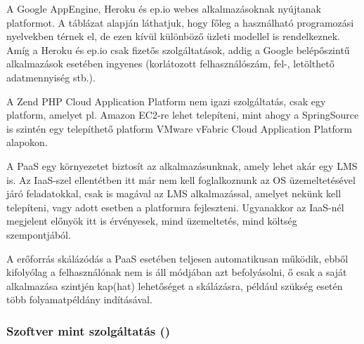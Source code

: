  

A Google AppEngine, Heroku és ep.io webes alkalmazásoknak nyújtanak platformot. A táblázat alapján láthatjuk, hogy főleg a használható programozási nyelvekben térnek el, de ezen kívül különböző üzleti modellel is rendelkeznek. Amíg a Heroku és ep.io csak fizetős szolgáltatások, addig a Google belépőszintű alkalmazások esetében ingyenes (korlátozott felhasználószám, fel-, letölthető adatmennyiség stb.).

A Zend PHP Cloud Application Platform nem igazi szolgáltatás, csak egy platform, amelyet pl. Amazon EC2-re lehet telepíteni, mint ahogy a SpringSource is szintén egy telepíthető platform VMware vFabric Cloud Application Platform alapokon.

A PaaS egy környezetet biztosít az alkalmazásunknak, amely lehet akár egy LMS is. Az IaaS-szel ellentétben itt már nem kell foglalkoznunk az OS üzemeltetésével járó feladatokkal, csak is magával az LMS alkalmazással, amelyet nekünk kell telepíteni, vagy adott esetben a platformra fejleszteni. Ugyanakkor az IaaS-nél megjelent előnyök itt is érvényesek, mind üzemeltetés, mind költség szempontjából.

A erőforrás skálázódás a PaaS esetében teljesen automatikusan működik, ebből kifolyólag a felhasználónak nem is áll módjában azt befolyásolni, ő csak a saját alkalmazása szintjén kap(hat) lehetőséget a skálázásra, például szükség esetén több folyamatpéldány indításával.

\subsubsection{Szoftver mint szolgáltatás ()}

